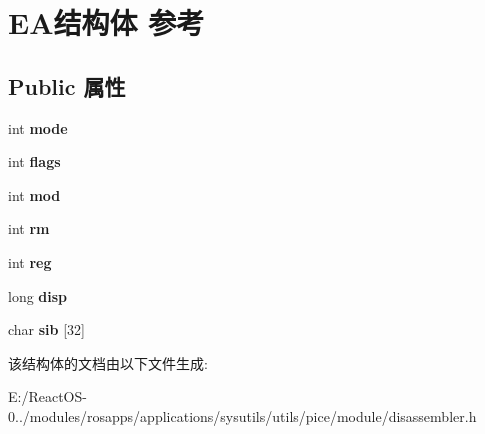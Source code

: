 \hypertarget{struct_e_a}{}\section{E\+A结构体 参考}
\label{struct_e_a}
\subsection*{Public 属性}
\begin{DoxyCompactItemize}
\item 
\mbox{\label{struct_e_a_a78ac50760ea7f7b8f96f89ba1927a62d}} 
int {\bfseries mode}
\item 
\mbox{\label{struct_e_a_a61b6a93772afa48385ab03bbba4e66f0}} 
int {\bfseries flags}
\item 
\mbox{\label{struct_e_a_a1c71547b86db5653b13c1d57445e9d28}} 
int {\bfseries mod}
\item 
\mbox{\label{struct_e_a_aaaedd155afaecad1ccc8715ad111c208}} 
int {\bfseries rm}
\item 
\mbox{\label{struct_e_a_ac39b8204b4f5553744ee93de656d7026}} 
int {\bfseries reg}
\item 
\mbox{\label{struct_e_a_aaf026cf911f7e219c488c44ed0470021}} 
long {\bfseries disp}
\item 
\mbox{\label{struct_e_a_afd3230831ff9989cd19f6f94df5bc851}} 
char {\bfseries sib} \mbox{[}32\mbox{]}
\end{DoxyCompactItemize}


该结构体的文档由以下文件生成\+:\begin{DoxyCompactItemize}
\item 
E\+:/\+React\+O\+S-\/0../modules/rosapps/applications/sysutils/utils/pice/module/disassembler.\+h\end{DoxyCompactItemize}
